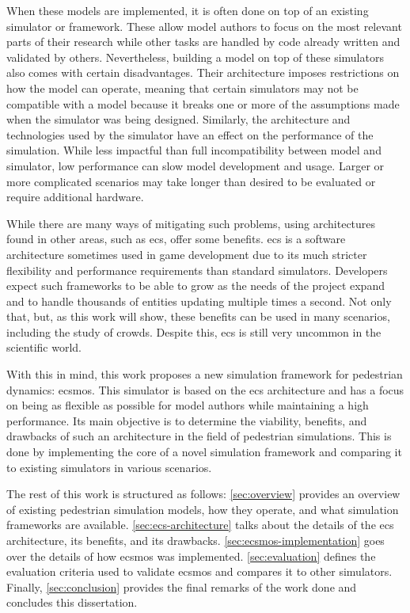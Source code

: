 \documentclass[twoside, 11pt]{article}
\begin{document}
When these models are implemented, it is often done on top of an existing simulator or framework. These allow model authors to focus on the most relevant parts of their research while other tasks are handled by code already written and validated by others. Nevertheless, building a model on top of these simulators also comes with certain disadvantages. Their architecture imposes restrictions on how the model can operate, meaning that certain simulators may not be compatible with a model because it breaks one or more of the assumptions made when the simulator was being designed. Similarly, the architecture and technologies used by the simulator have an effect on the performance of the simulation. While less impactful than full incompatibility between model and simulator, low performance can slow model development and usage. Larger or more complicated scenarios may take longer than desired to be evaluated or require additional hardware.

While there are many ways of mitigating such problems, using architectures found in other areas, such as \gls{ecs}, offer some benefits. \gls{ecs} is a software architecture sometimes used in game development due to its much stricter flexibility and performance requirements than standard simulators. Developers expect such frameworks to be able to grow as the needs of the project expand and to handle thousands of entities updating multiple times a second. Not only that, but, as this work will show, these benefits can be used in many scenarios, including the study of crowds. Despite this, \gls{ecs} is still very uncommon in the scientific world.

With this in mind, this work proposes a new simulation framework for pedestrian dynamics: \gls{ecsmos}. This simulator is based on the \gls{ecs} architecture and has a focus on being as flexible as possible for model authors while maintaining a high performance. Its main objective is to determine the viability, benefits, and drawbacks of such an architecture in the field of pedestrian simulations. This is done by implementing the core of a novel simulation framework and comparing it to existing simulators in various scenarios.


The rest of this work is structured as follows: \autoref{sec:overview} provides an overview of existing pedestrian simulation models, how they operate, and what simulation frameworks are available. \autoref{sec:ecs-architecture} talks about the details of the \gls{ecs} architecture, its benefits, and its drawbacks. \autoref{sec:ecsmos-implementation} goes over the details of how \gls{ecsmos} was implemented. \autoref{sec:evaluation} defines the evaluation criteria used to validate \gls{ecsmos} and compares it to other simulators. Finally, \autoref{sec:conclusion} provides the final remarks of the work done and concludes this dissertation.
\end{document}

